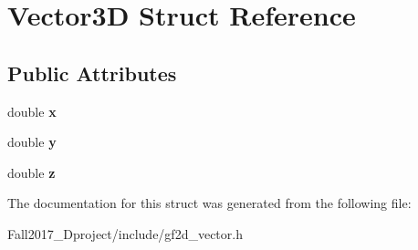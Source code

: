 \hypertarget{struct_vector3_d}{}\section{Vector3D Struct Reference}
\label{struct_vector3_d}
\subsection*{Public Attributes}
\begin{DoxyCompactItemize}
\item 
\mbox{\label{struct_vector3_d_a3c086dfccfc57dd996e9b8600098a430}} 
double {\bfseries x}
\item 
\mbox{\label{struct_vector3_d_adcec384756103d26d1181e45d5a0fd78}} 
double {\bfseries y}
\item 
\mbox{\label{struct_vector3_d_a7321f3ff785f275c4d83f7d1b951752a}} 
double {\bfseries z}
\end{DoxyCompactItemize}


The documentation for this struct was generated from the following file\+:\begin{DoxyCompactItemize}
\item 
Fall2017\+\_\+Dproject/include/gf2d\+\_\+vector.\+h\end{DoxyCompactItemize}
